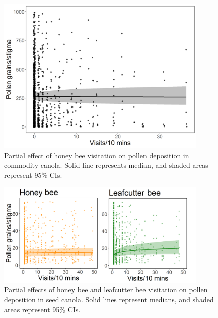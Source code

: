 \documentclass[12pt]{article} %
\begin{document}
\begin{figure}
    \centering
    \includegraphics[width=0.9\textwidth,keepaspectratio=true]{slopeHbeeVisPol.png}
    \caption[Partial effect of honey bee visitation on pollen deposition in commodity canola]{Partial effect of honey bee visitation on pollen deposition in commodity canola. Solid line represents median, and shaded areas represent 95\% CIs.}
    \label{fig:hbeeVisPol}
\end{figure}

\begin{figure}
    \centering
    \includegraphics[width=0.9\textwidth,keepaspectratio=true]{slopeVisPol_both.png}
    \caption[Partial effects of honey bee and leafcutter bee visitation on pollen deposition in seed canola]{Partial effects of honey bee and leafcutter bee visitation on pollen deposition in seed canola. Solid lines represent medians, and shaded areas represent 95\% CIs.}
    \label{fig:visPol_both}
\end{figure}
\end{document}
